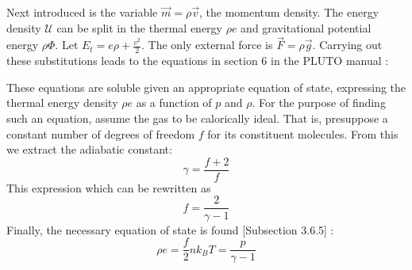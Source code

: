 {\centering 
\noindent {}
\par}

Next introduced is the variable $\vec{m}=\rho \vec{v}$, the momentum density. The energy density $\mathcal{U}$ can be split in the thermal energy $\rho e$ and gravitational potential energy $\rho\Phi$. Let $E_t = e\rho + \frac{v^2}{2}$. The only external force is $\vec{F} = \rho\vec{g}$.
Carrying out these substitutions leads to the equations in section 6 in the PLUTO manual \cite{pluto-manual}:

{\centering 
\noindent {}
\par}

These equations are soluble given an appropriate equation of state, expressing the thermal energy density $\rho e$ as a function of $p$ and $\rho$. For the purpose of finding such an equation, assume the gas to be calorically ideal. That is, presuppose a constant number of degrees of freedom $f$ for its constituent molecules. From this we extract the adiabatic constant:
\begin{equation}
	\gamma = \frac{f+2}{f}
	\label{eq:adiabatic constant}
\end{equation}
This expression which can be rewritten as
\begin{equation*}
	f = \frac{2}{\gamma-1}
\end{equation*}
Finally, the necessary equation of state is found \cite{notes-fluid-dynamics}[Subsection 3.6.5] :
\begin{equation*}
	\rho e = \frac{f}{2}nk_BT = \frac{p}{\gamma-1}
\end{equation*}

